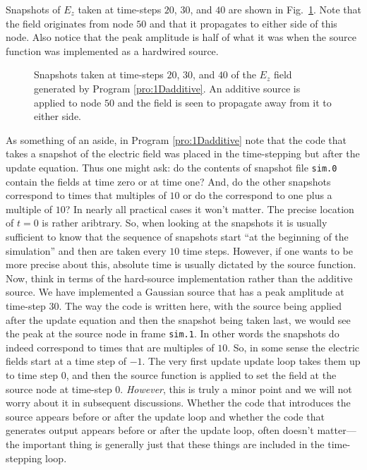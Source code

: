 Snapshots of $E_z$ taken at time-steps $20$, $30$, and $40$ are shown
in Fig.\ \ref{fig:additive}.  Note that the field originates from node
$50$ and that it propagates to either side of this node.  Also notice
that the peak amplitude is half of what it was when the source
function was implemented as a hardwired source.
\begin{figure}
  \begin{center}
  \end{center}
  \caption{Snapshots taken at time-steps $20$, $30$, and $40$ of the
    $E_z$ field generated by Program \ref{pro:1Dadditive}.  An
    additive source is applied to node $50$ and the field is seen to
    propagate away from it to either side.}
  \label{fig:additive} 
\end{figure}

As something of an aside, in Program \ref{pro:1Dadditive} note that
the code that takes a snapshot of the electric field was placed in the
time-stepping but after the update equation.  Thus one might ask: do
the contents of snapshot file {\tt sim.0} contain the fields at time
zero or at time one?  And, do the other snapshots correspond to times
that multiples of $10$ or do the correspond to one plus a multiple of
$10$?  In nearly all practical cases it won't matter.  The precise
location of $t=0$ is rather aribtrary.  So, when looking at the
snapshots it is usually sufficient to know that the sequence of
snapshots start ``at the beginning of the simulation'' and then are
taken every $10$ time steps.  However, if one wants to be more precise
about this, absolute time is usually dictated by the source function.
Now, think in terms of the hard-source implementation rather than the
additive source.  We have implemented a Gaussian source that has a
peak amplitude at time-step $30$.  The way the code is written here,
with the source being applied after the update equation and then the
snapshot being taken last, we would see the peak at the source node in
frame {\tt sim.1}.  In other words the snapshots do indeed correspond
to times that are multiples of $10$.  So, in some sense the electric
fields start at a time step of $-1$.  The very first update update
loop takes them up to time step $0$, and then the source function is
applied to set the field at the source node at time-step $0$.  {\em
  However}, this is truly a minor point and we will not worry about it
in subsequent discussions.  Whether the code that introduces the
source appears before or after the update loop and whether the code
that generates output appears before or after the update loop, often
doesn't matter---the important thing is generally just that these
things are included in the time-stepping loop.

